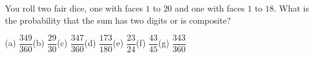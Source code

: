 You roll two fair dice, one with faces $1$ to $20$ and one with faces $1$ to $18$. What is the probability that the sum has two digits or is composite?

(a) $\dfrac{349}{360}$\quad (b) $\dfrac{29}{30}$\quad (c) $\dfrac{347}{360}$\quad (d) $\dfrac{173}{180}$\quad (e) $\dfrac{23}{24}$\quad (f) $\dfrac{43}{45}$\quad (g) $\dfrac{343}{360}$
